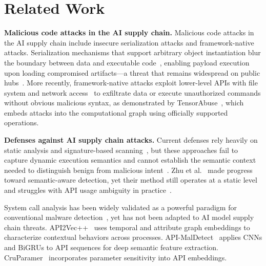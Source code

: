 \section{Related Work}

\noindent \textbf{Malicious code attacks in the AI supply chain.}
Malicious code attacks in the AI supply chain include insecure serialization attacks and framework-native attacks. Serialization mechanisms that support arbitrary object instantiation blur the boundary between data and executable code~\cite{NEURIPS2019_bdbca288, 3368680}, enabling payload execution upon loading compromised artifacts—a threat that remains widespread on public hubs~\cite{3765037, casey2024largescaleexploitinstrumentationstudy, MLSYS2025_75bb91b9}. More recently, framework-native attacks exploit lower-level APIs with file system and network access~\cite{199317} to exfiltrate data or execute unauthorized commands without obvious malicious syntax, as demonstrated by TensorAbuse~\cite{zhu2025}, which embeds attacks into the computational graph using officially supported operations.

\noindent \textbf{Defenses against AI supply chain attacks.}
Current defenses rely heavily on static analysis and signature-based scanning~\cite{fickling, picklescanning}, but these approaches fail to capture dynamic execution semantics and cannot establish the semantic context needed to distinguish benign from malicious intent~\cite{ohayon2026safepicklerobustgenericml}. Zhu et al.~\cite{zhu2025} made progress toward semantic-aware detection, yet their method still operates at a static level and struggles with API usage ambiguity in practice~\cite{3735968}.

System call analysis has been widely validated as a powerful paradigm for conventional malware detection~\cite{102526,101007}, yet has not been adapted to AI model supply chain threats. API2Vec++~\cite{10586831} uses temporal and attribute graph embeddings to characterize contextual behaviors across processes. API-MalDetect~\cite{103704} applies CNNs and BiGRUs to API sequences for deep semantic feature extraction. CruParamer~\cite{9715123} incorporates parameter sensitivity into API embeddings.
